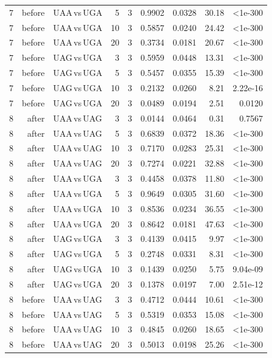 \begin{longtable}{rrlrlrrrr}
7 & before & UAA$\,$vs$\,$UGA & 5 & 3 & 0.9902 & 0.0328 & 30.18 & <1e-300 \\
7 & before & UAA$\,$vs$\,$UGA & 10 & 3 & 0.5857 & 0.0240 & 24.42 & <1e-300 \\
7 & before & UAA$\,$vs$\,$UGA & 20 & 3 & 0.3734 & 0.0181 & 20.67 & <1e-300 \\
7 & before & UAG$\,$vs$\,$UGA & 3 & 3 & 0.5959 & 0.0448 & 13.31 & <1e-300 \\
7 & before & UAG$\,$vs$\,$UGA & 5 & 3 & 0.5457 & 0.0355 & 15.39 & <1e-300 \\
7 & before & UAG$\,$vs$\,$UGA & 10 & 3 & 0.2132 & 0.0260 & 8.21 & 2.22e-16 \\
7 & before & UAG$\,$vs$\,$UGA & 20 & 3 & 0.0489 & 0.0194 & 2.51 & 0.0120 \\
8 & after & UAA$\,$vs$\,$UAG & 3 & 3 & 0.0144 & 0.0464 & 0.31 & 0.7567 \\
8 & after & UAA$\,$vs$\,$UAG & 5 & 3 & 0.6839 & 0.0372 & 18.36 & <1e-300 \\
8 & after & UAA$\,$vs$\,$UAG & 10 & 3 & 0.7170 & 0.0283 & 25.31 & <1e-300 \\
8 & after & UAA$\,$vs$\,$UAG & 20 & 3 & 0.7274 & 0.0221 & 32.88 & <1e-300 \\
8 & after & UAA$\,$vs$\,$UGA & 3 & 3 & 0.4458 & 0.0378 & 11.80 & <1e-300 \\
8 & after & UAA$\,$vs$\,$UGA & 5 & 3 & 0.9649 & 0.0305 & 31.60 & <1e-300 \\
8 & after & UAA$\,$vs$\,$UGA & 10 & 3 & 0.8536 & 0.0234 & 36.55 & <1e-300 \\
8 & after & UAA$\,$vs$\,$UGA & 20 & 3 & 0.8642 & 0.0181 & 47.63 & <1e-300 \\
8 & after & UAG$\,$vs$\,$UGA & 3 & 3 & 0.4139 & 0.0415 & 9.97 & <1e-300 \\
8 & after & UAG$\,$vs$\,$UGA & 5 & 3 & 0.2748 & 0.0331 & 8.31 & <1e-300 \\
8 & after & UAG$\,$vs$\,$UGA & 10 & 3 & 0.1439 & 0.0250 & 5.75 & 9.04e-09 \\
8 & after & UAG$\,$vs$\,$UGA & 20 & 3 & 0.1378 & 0.0197 & 7.00 & 2.51e-12 \\
8 & before & UAA$\,$vs$\,$UAG & 3 & 3 & 0.4712 & 0.0444 & 10.61 & <1e-300 \\
8 & before & UAA$\,$vs$\,$UAG & 5 & 3 & 0.5319 & 0.0353 & 15.08 & <1e-300 \\
8 & before & UAA$\,$vs$\,$UAG & 10 & 3 & 0.4845 & 0.0260 & 18.65 & <1e-300 \\
8 & before & UAA$\,$vs$\,$UAG & 20 & 3 & 0.5013 & 0.0198 & 25.26 & <1e-300 \\

\end{longtable}
